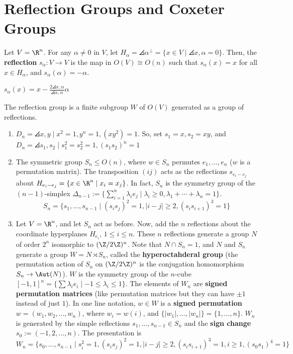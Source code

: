 \section{Reflection Groups and Coxeter Groups}
\begin{defn}[Reflections]
    Let $V = \R^n$. For any $\alpha \neq 0$ in $V$, let $H_\alpha = \angles{\alpha}^{\perp}=\{ x \in V \mid \angles{x ,\alpha}=0\}$. Then, the \textbf{reflection} $s_\alpha:V \to V$ is the map in $O(V)\cong O(n)$ such that $s_\alpha (x)=x$ for all $x \in H_\alpha$, and $s_\alpha (\alpha) = -\alpha$.
\end{defn}

\begin{prop}
    $s_\alpha (x) = x- \frac{2\angles{x,\alpha}}{\angles{\alpha,\alpha}}\alpha$
\end{prop}

\begin{defn}
    The reflection group is a finite subgroup $W$ of $O(V)$ generated as a group of reflections.
\end{defn}

\begin{ex}
    \begin{enumerate}
        \item $D_n = \angles{x,y \mid x^2=1,y^n=1,(xy^2)=1}$. So, set $s_1 = x,s_2=xy$, and $D_n = \angles{s_1,s_2 \mid s_1^2=s_2^2=1,(s_1s_2)^n=1}$
        \item The symmetric group $S_n \leq O(n)$, where $w \in S_n$ permutes $e_1,\dots,e_n$ ($w$ is a permutation matrix). The transposition $(ij)$ acts as the reflections $s_{e_i-e_j}$ about $H_{e_i-e_j}=\{x \in \R^n \mid x_i=x_j\}$. In fact, $S_n$ is the symmetry group of the $(n-1)$-simplex $\Delta_{n-1}:=\{\sum_{i=1}^n\lambda_ie_j \mid \lambda_i \geq 0, \lambda_1+\cdots + \lambda_n=1\}$.
        $$S_n = \{s_1,\dots, s_{n-1} \mid (s_is_j)^2=1,|i-j|\geq 2,(s_is_{i+1})^3=1\}$$
        \item Let $V = \R^n$, and let $S_n$ act as before. Now, add the $n$ reflections about the coordinate hyperplanes $H_{e_i}$, $1 \leq i \leq n$. These $n$ reflections generate a group $N$ of order $2^n$ isomorphic to $(\Z/2\Z)^n$. Note that $N \cap S_n=1$, and $N$ and $S_n$ generate a group $W=N \rtimes S_n$, called the \textbf{hyperoctahderal group} (the permutation action of $S_n$ on $(\Z/2\Z)^n$ is the conjugation homomorphism $S_n \to \Aut (N)$). $W$ is the symmetry group of the $n$-cube $[-1,1]^n=\{ \sum \lambda _ie_i \mid -1 \leq \lambda _i \leq 1\}$. The elements of $W_n$ are \textbf{signed permutation matrices} (like permutation matrices but they can have $\pm 1$ instead of just $1$). In one line notation, $w \in W$ is a \textbf{signed permutation} $w=(w_1,w_2,\dots,w_n)$, where $w_i = w(i)$, and $\{|w_1|,\dots, |w_n|\}=\{1,\dots,n\}$. $W_n$ is generated by the simple reflections $s_1,\dots,s_{n-1} \in S_n$ and the \textbf{sign change} $s_0:= (-1,2,\dots,n)$. The presentation is $W_n = \{s_0,\dots ,s_{n-1} \mid s_i^2=1,(s_is_j)^2=1,|i-j|\geq 2,(s_is_{i+1})^3=1,i\geq 1,(s_0s_1)^4=1\}$
    \end{enumerate}
\end{ex}

